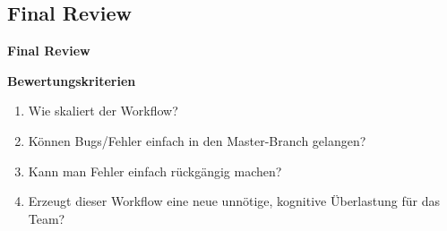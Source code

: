 \begin{frame}[c]
    \slidehead
    \centering
    \Large
\end{frame}

\subsection{Final Review}\label{subsec:final-review}
\begin{frame}[c]
    \slidehead
    \centering
    \Large
    \textbf{Final Review}
\end{frame}

\begin{frame}[c]
    \slidehead
    \large
    \textbf{Bewertungskriterien}
    \normalsize
    \begin{enumerate}
        \item<2-> Wie skaliert der Workflow? 
        \item<4-> Können Bugs/Fehler einfach in den Master-Branch gelangen? 
        \item<6-> Kann man Fehler einfach rückgängig machen? 
        \item<8-> Erzeugt dieser Workflow eine neue unnötige, kognitive Überlastung für das Team? 
    \end{enumerate}
\end{frame}
